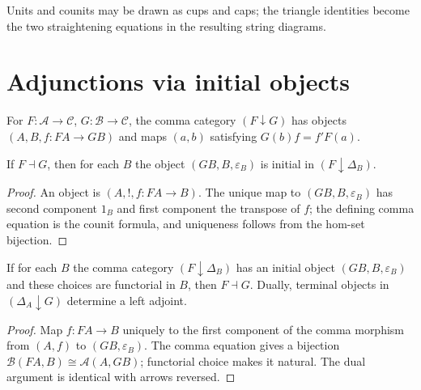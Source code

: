 \begin{remark}
\label{rem:lbc-string-diagrams}
Units and counits may be drawn as cups and caps; the triangle identities become
the two straightening equations in the resulting string diagrams.
\end{remark}

\section{Adjunctions via initial objects}
\begin{definition}
\label{def:lbc-comma}
For $F:\mathcal A\to\mathcal C$, $G:\mathcal B\to\mathcal C$, the comma category
$(F\downarrow G)$ has objects $(A,B,f:FA\to GB)$ and maps $(a,b)$ satisfying
$G(b)f=f'F(a)$.
\end{definition}

\begin{lemma}
\label{lem:lbc-adjunction-comma-initial}
If $F\dashv G$, then for each $B$ the object $(G B,B,\varepsilon_B)$ is initial
in $(F\downarrow\Delta_B)$.
\end{lemma}
\begin{proof}
An object is $(A,!,f:FA\to B)$. The unique map to $(GB,B,\varepsilon_B)$ has
second component $1_B$ and first component the transpose of $f$; the defining
comma equation is the counit formula, and uniqueness follows from the hom-set
bijection.
\end{proof}

\begin{theorem}
\label{thm:lbc-adjunction-comma}
If for each $B$ the comma category $(F\downarrow\Delta_B)$ has an initial object
$(G B,B,\varepsilon_B)$ and these choices are functorial in $B$, then
$F\dashv G$. Dually, terminal objects in $(\Delta_A\downarrow G)$ determine a
left adjoint.
\end{theorem}
\begin{proof}
Map $f:FA\to B$ uniquely to the first component of the comma morphism from
$(A, f)$ to $(GB,\varepsilon_B)$. The comma equation gives a bijection
$\mathcal B(FA,B)\cong\mathcal A(A,GB)$; functorial choice makes it natural.
The dual argument is identical with arrows reversed.
\end{proof}

